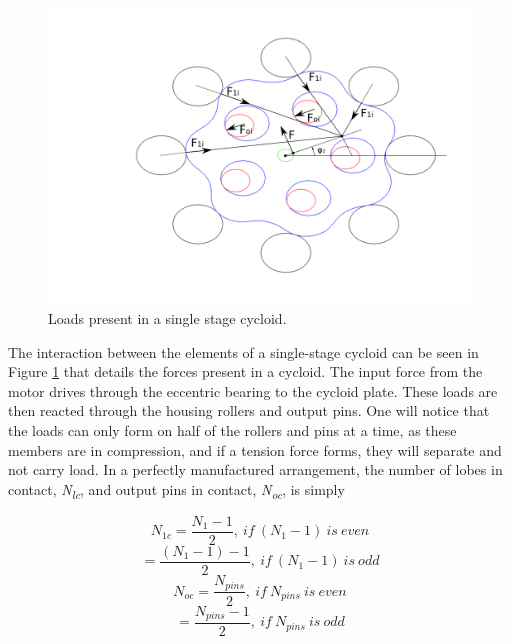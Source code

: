 \begin{figure}[t]
   \centering
   \includegraphics[width=01.0\linewidth]{fig/single_loads}
   \caption{Loads present in a single stage cycloid.}
   \label{fig:single_loads}
\end{figure}

The interaction between the elements of a single-stage cycloid can be seen in Figure \ref{fig:single_loads} that details the forces present in a cycloid. The input force from the motor drives through the eccentric bearing to the cycloid plate. These loads are then reacted through the housing rollers and output pins. One will notice that the loads can only form on half of the rollers and pins at a time, as these members are in compression, and if a tension force forms, they will separate and not carry load. In a perfectly manufactured arrangement, the number of lobes in contact, \textit{N\textsubscript{lc}}, and output pins in contact, \textit{N\textsubscript{oc}}, is simply 


\begin{equation}
N_{1c} = \frac{N_{1} - 1}{2},\ if\ (N_1 -1)\ is\ even 
\end{equation}
\begin{equation}
= \frac{(N_{1}-1) - 1}{2},\ if\ (N_{1} - 1)\ is\ odd 
\end{equation}
\begin{equation}
N_{oc} = \frac{N_{pins}}{2},\ if\ N_{pins}\ is\ even 
\end{equation}
\begin{equation}
= \frac{N_{pins} - 1}{2},\ if\ N_{pins}\ is\ odd 
\end{equation}

